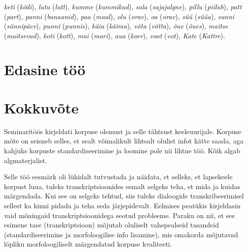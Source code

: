 \documentclass[12pt]{article}
\begin{document}
\emph{keti} (\emph{kõdi}), \emph{lutu} (\emph{lutt}), \emph{kumme} (\emph{kummikud}), \emph{sala} (\emph{sajajalgne}), \emph{pillu} (\emph{piilub}), \emph{patt} (\emph{part}), \emph{panni} (\emph{banaanid}), \emph{paa} (\emph{maal}), \emph{olu} (\emph{orav}), \emph{oa} (\emph{orav}), \emph{süü} (\emph{süüa}), \emph{sunni} (\emph{sünnipäev}), \emph{punni} (\emph{punnis}), \emph{käia} (\emph{käima}), \emph{võta} (\emph{võtta}), \emph{õue} (\emph{õues}), \emph{maitse} (\emph{maitsevad}), \emph{koti} (\emph{kott}), \emph{mai} (\emph{mari}), \emph{aua} (\emph{koer}), \emph{voot} (\emph{vot}), \emph{Kate} (\emph{Kattre}).





\newpage
\section{Edasine töö}
\newpage

\section*{Kokkuvõte}

Seminaritöös kirjeldati korpuse olemust ja selle tähtsust keeleuurijale. Korpuse mõte on seisneb selles, et sealt võimalikult lihtsalt olulist infot kätte saada, aga kahjuks korpuste standardiseerimine ja loomine pole nii lihtne töö. Kõik algab algmaterjalist. 

Selle töö eesmärk oli lühidalt tutvustada ja näidata, et selleks, et lapsekeele korpust luua, tuleks transkriptsioonides esmalt selgeks teha, et mida ja kuidas märgendada. Kui see on selgeks tehtud, siis tuleks dialoogide transkribeerimisel sellest ka kinni pidada ja teha seda järjepidevalt. Eelmises peatükis kirjeldasin vaid mõningaid transkriptsioonidega seotud probleeme. Paraku on nii, et see esimene tase (transkriptsioon) mõjutab oluliselt vahepealseid tasandeid (standardiseerimine ja morfoloogilise info lisamine), mis omakorda mõjutavad lõpliku morfoloogiliselt märgendatud korpuse kvaliteeti.

\newpage
\cleardoublepage
{}
{}


\end{document}

